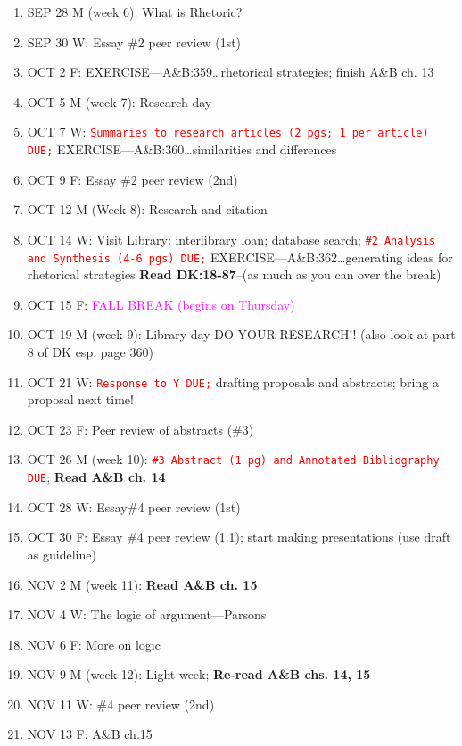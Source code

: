 \documentclass[11pt]{article}
\begin{document}
\begin{enumerate}
\item SEP 28 M (week 6): What is Rhetoric?
\item[] SEP 30 W: Essay \#2 peer review (1st)
\item[] OCT 2 F: EXERCISE---A\&B:359\ldots rhetorical strategies; finish A\&B ch. 13

\item OCT 5 M (week 7): Research day
\item[] OCT 7 W: \textcolor{red}{\texttt{Summaries to research articles (2 pgs; 1 per article) DUE;}} EXERCISE---A\&B:360\ldots similarities and differences
\item[] OCT 9 F: Essay \#2 peer review (2nd)

\item OCT 12 M (Week 8): Research and citation
\item[] OCT 14 W:  Visit Library: interlibrary loan; database search; \textcolor{red}{\texttt{\#2 Analysis and Synthesis (4-6 pgs) DUE;}}  EXERCISE---A\&B:362\ldots generating ideas for rhetorical strategies {\bf Read DK:18-87}--(as much as
you can over the break)
\item[]  OCT 15 F: \textcolor{magenta}{FALL BREAK (begins on Thursday)} 

\item OCT 19 M (week 9): Library day DO YOUR RESEARCH!! (also look at part 8 of DK esp. page 360)
\item[] OCT 21 W: \textcolor{red}{\texttt{Response to Y DUE;}} drafting proposals and abstracts; bring a
proposal next time!
\item[] OCT 23 F: Peer review of abstracts (\#3)

\item OCT 26 M (week 10): \textcolor{red}{\texttt{\#3 Abstract (1 pg) and Annotated Bibliography DUE}}; {\bf Read A\&B ch. 14}
\item[] OCT 28 W: Essay\#4 peer review (1st)
\item[] OCT 30 F: Essay \#4 peer review (1.1); start making presentations (use draft as guideline)

\item NOV 2 M (week 11): {\bf Read A\&B ch. 15} 
\item[] NOV 4 W: The logic of argument---Parsons
\item[] NOV 6 F: More on logic

\item NOV 9 M (week 12): Light week; {\bf Re-read A\&B chs. 14, 15}
\item[] NOV 11 W: \#4 peer review (2nd)
\item[] NOV 13 F: A\&B ch.15


\end{enumerate}
\end{document}

